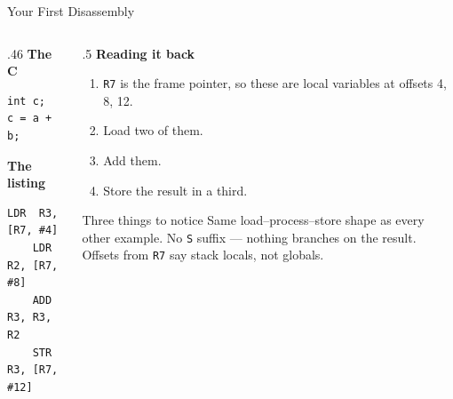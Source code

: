 \documentclass[9pt,aspectratio=169,xcolor=table]{beamer}
\begin{document}
\begin{frame}[fragile]{Your First Disassembly}
    \begin{columns}[T]
    \begin{column}{.46\textwidth}
        \textbf{The C}

        \vspace{1mm}
        \begin{lstlisting}[style=myc]
int c;
c = a + b;
        \end{lstlisting}

        \vspace{3mm}
        \textbf{The listing}

        \vspace{1mm}
        \begin{lstlisting}[style=armasm, language=ARM, basicstyle=\footnotesize\ttfamily]
	LDR  R3, [R7, #4]
	LDR  R2, [R7, #8]
	ADD  R3, R3, R2
	STR  R3, [R7, #12]
        \end{lstlisting}
    \end{column}
    \begin{column}{.5\textwidth}
        \textbf{Reading it back}

        \vspace{1mm}
        {\small
        \begin{enumerate}\itemsep1pt
            \item \texttt{R7} is the \alert{frame pointer}, so these are
                  \alert{local variables} at offsets 4, 8, 12.
            \item Load two of them.
            \item Add them.
            \item Store the result in a third.
        \end{enumerate}}

        \vspace{3mm}
        \begin{block}{Three things to notice}
            {\small Same \alert{load--process--store} shape as every other
            example. No \texttt{S} suffix --- nothing branches on the
            result. Offsets from \texttt{R7} say \alert{stack locals}, not
            globals.}
        \end{block}
    \end{column}
    \end{columns}
\end{frame}
\end{document}
